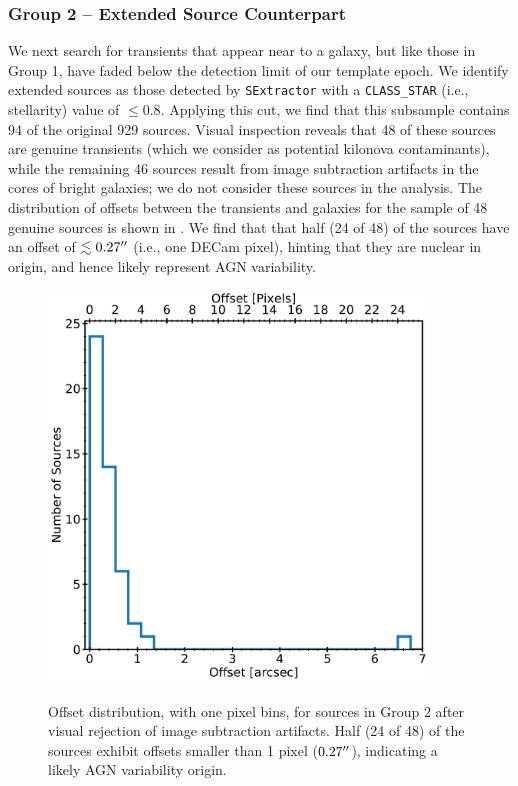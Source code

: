 \subsubsection{Group 2 -- Extended Source Counterpart}
\label{sec:ch3_group2}
We next search for transients that appear near to a galaxy, but like those in Group 1, have faded below the detection limit of our template epoch. We identify extended sources as those detected by {\tt SExtractor} with a {\tt CLASS\_STAR} (i.e., stellarity) value of $\le 0.8$. Applying this cut, we find that this subsample contains 94 of the original 929 sources. Visual inspection reveals that 48 of these sources are genuine transients (which we consider as potential kilonova contaminants), while the remaining 46 sources result from image subtraction artifacts in the cores of bright galaxies; we do not consider these sources in the analysis. The distribution of offsets between the transients and galaxies for the sample of 48 genuine sources is shown in . We find that that half (24 of 48) of the sources have an offset of $\lesssim 0.27\hbox{$^{\prime\prime}$}$ (i.e., one DECam pixel), hinting that they are nuclear in origin, and hence likely represent AGN variability.

\begin{figure}[!t]
\begin{center}
\hspace*{-0.1in}
\scalebox{1.}
{\includegraphics[width=0.9\textwidth]{./figs/chapter3/f1.pdf}}
\caption{Offset distribution, with one pixel bins, for sources in Group 2 after visual rejection of image subtraction artifacts. Half (24 of 48) of the sources exhibit offsets smaller than 1 pixel ($0.27\hbox{$^{\prime\prime}$}$), indicating a likely AGN variability origin.}
\label{fig:ch3_offset_hist}
\end{center}
\end{figure}

